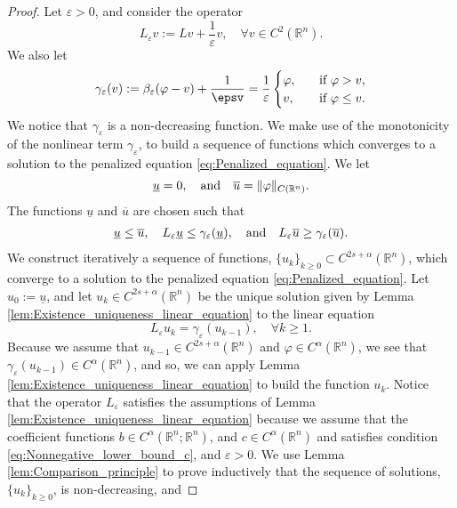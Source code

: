 \documentclass[11pt,reqno]{amsart}
\theoremstyle{definition}
\theoremstyle{remark}
\begin{document}
\begin{proof}
Let ${\varepsilon}>0$, and consider the operator
$$
L_{\varepsilon} v := Lv + \frac{1}{\varepsilon} v,\quad\forall v \in C^2({\mathbb{R}}^n).
$$
We also let
\begin{equation}
\label{eq:Definition_gamma_eps}
\begin{aligned}
\gamma_{\varepsilon}(v):=\beta_{\varepsilon}(\varphi-v)+\frac{1}\epsv
= \frac{1}{\varepsilon}
\begin{cases}
\varphi,&\quad\hbox{if }\varphi>v,\\
v,&\quad\hbox{if }\varphi\leq v.
\end{cases}
\end{aligned}
\end{equation}
We notice that $\gamma_{\varepsilon}$ is a non-decreasing function. We make use of the monotonicity of the nonlinear term $\gamma_{\varepsilon}$, to build a sequence of functions which converges to a solution to the penalized equation \eqref{eq:Penalized_equation}. We let
$$
\underline u = 0,\quad\hbox{and}\quad\overline u = \|\varphi\|_{C({\mathbb{R}}^n)}. 
$$
The functions $\underline u$ and $\overline u$ are chosen such that 
\begin{align*}
\underline u \leq \overline u,\quad L_{\varepsilon} \underline u \leq \gamma_{\varepsilon}(\underline u),\quad\hbox{and}\quad L_{\varepsilon} \overline u \geq \gamma_{\varepsilon}(\overline u).
\end{align*}
We construct iteratively a sequence of functions, $\{u_k\}_{k\geq 0}\subset C^{2s+\alpha}({\mathbb{R}}^n)$, which converge to a solution to the penalized equation \eqref{eq:Penalized_equation}. Let $u_0:=\underline u$, and let $u_k\in C^{2s+\alpha}({\mathbb{R}}^n)$ be the unique solution given by Lemma \ref{lem:Existence_uniqueness_linear_equation} to the linear equation
\begin{equation}
\label{eq:L_eps_equation}
L_{\varepsilon} u_k=\gamma_{\varepsilon}(u_{k-1}),\quad \forall k\geq 1.
\end{equation}
Because we assume that $u_{k-1}\in C^{2s+\alpha}({\mathbb{R}}^n)$ and $\varphi \in C^{\alpha}({\mathbb{R}}^n)$, we see that $\gamma_{\varepsilon}(u_{k-1})\in C^{\alpha}({\mathbb{R}}^n)$, and so, we can apply Lemma \ref{lem:Existence_uniqueness_linear_equation} to build the function $u_k$. Notice that the operator $L_{\varepsilon}$ satisfies the assumptions of Lemma \ref{lem:Existence_uniqueness_linear_equation} because we assume that the coefficient functions  $b\in C^{\alpha}({\mathbb{R}}^n;{\mathbb{R}}^n)$, and $c\in C^{\alpha}({\mathbb{R}}^n)$ and satisfies condition \eqref{eq:Nonnegative_lower_bound_c}, and ${\varepsilon}>0$. We use Lemma \ref{lem:Comparison_principle} to prove inductively that the sequence of solutions, $\{u_k\}_{k\geq 0}$, is non-decreasing, and

\end{proof}
\end{document}
